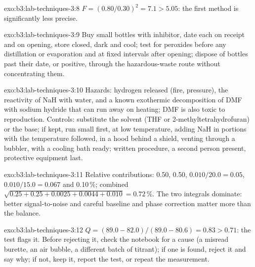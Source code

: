 \begin{solution}{exo:b3:lab-techniques-3:8}
$F = (0.80/0.30)^2 = 7.1 > 5.05$: the first method is significantly less precise.
\end{solution}

\begin{solution}{exo:b3:lab-techniques-3:9}
Buy small bottles with inhibitor, date each on receipt and on opening, store
closed, dark and cool; test for peroxides before any distillation or evaporation
and at fixed intervals after opening; dispose of bottles past their date, or
positive, through the hazardous-waste route without concentrating them.
\end{solution}

\begin{solution}{exo:b3:lab-techniques-3:10}
Hazards: hydrogen released (fire, pressure), the reactivity of NaH with water,
and a known exothermic decomposition of DMF with sodium hydride that can run away
on heating; DMF is also toxic to reproduction. Controls: substitute the solvent
(THF or 2-methyltetrahydrofuran) or the base; if kept, run small first, at low
temperature, adding NaH in portions with the temperature followed, in a hood
behind a shield, venting through a bubbler, with a cooling bath ready; written
procedure, a second person present, protective equipment last.
\end{solution}

\begin{solution}{exo:b3:lab-techniques-3:11}
Relative contributions: 0.50, 0.50, $0.010/20.0 = 0.05$, $0.010/15.0 = 0.067$ and 0.10\,\%; combined
$\sqrt{0.25 + 0.25 + 0.0025 + 0.0044 + 0.010} = 0.72$\,\%. The two integrals dominate: better signal-to-noise and
careful baseline and phase correction matter more than the balance.
\end{solution}

\begin{solution}{exo:b3:lab-techniques-3:12}
$Q = (89.0 - 82.0)/(89.0 - 80.6) = 0.83 > 0.71$: the test flags it. Before rejecting it, check the notebook
for a cause (a misread burette, an air bubble, a different batch of titrant); if one is
found, reject it and say why; if not, keep it, report the test, or repeat the
measurement.
\end{solution}

